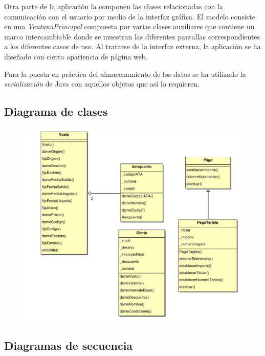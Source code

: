 \documentclass[11pt, a4paper, twoside, titlepage]{article}
\begin{document}
			Otra parte de la aplicación la componen las clases relacionadas con la comunicación con el usuario por medio de la interfaz gráfica. El modelo consiste en una \textit{VentanaPrincipal} compuesta por varias clases auxiliares que contiene un marco intercambiable donde se muestran las diferentes pantallas correspondientes a los diferentes casos de uso. Al tratarse de la interfaz externa, la aplicación se ha diseñado con cierta apariencia de página web.

			Para la puesta en práctica del almacenamiento de los datos se ha utilizado la \textit{serialización} de Java con aquellos objetos que así lo requieren.
			

		\subsection{Diagrama de clases}

			\begin{figure}[H]\centering
				\hspace{-2cm}
				\includegraphics[scale=.57]{diagramas/diagramaclases.pdf}
			\end{figure}

		\subsection{Diagramas de secuencia}
\end{document}
